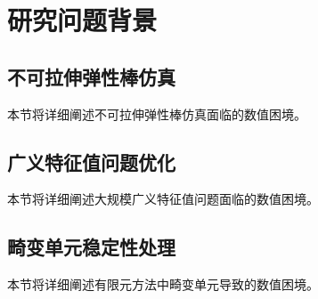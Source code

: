 
\section{研究问题背景}

\subsection{不可拉伸弹性棒仿真}

本节将详细阐述不可拉伸弹性棒仿真面临的数值困境。

\subsection{广义特征值问题优化}

本节将详细阐述大规模广义特征值问题面临的数值困境。

\subsection{畸变单元稳定性处理}

本节将详细阐述有限元方法中畸变单元导致的数值困境。
